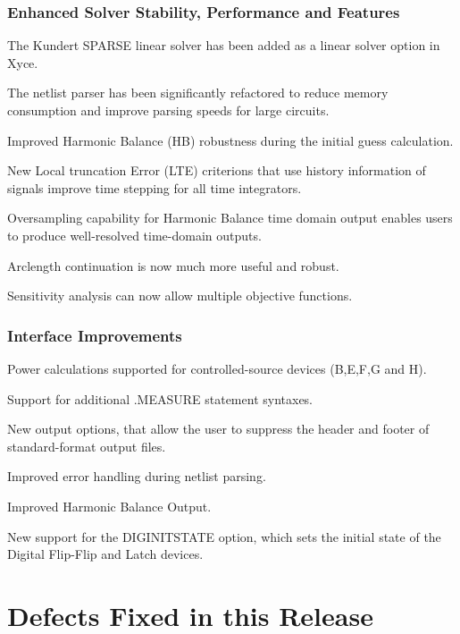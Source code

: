 \documentclass{article}
\begin{document}
\subsubsection*{Enhanced Solver Stability, Performance and Features}
\begin{XyceItemize}
  \item The Kundert SPARSE linear solver has been added as a linear solver option in Xyce.  
  \item The netlist parser has been significantly refactored to reduce memory
        consumption and improve parsing speeds for large circuits.
  \item Improved Harmonic Balance (HB) robustness during the initial guess calculation.
  \item New Local truncation Error (LTE) criterions that use history information of signals improve time stepping for all time integrators.
  \item Oversampling capability for Harmonic Balance time domain output enables users to produce well-resolved time-domain outputs.
  \item Arclength continuation is now much more useful and robust.
  \item Sensitivity analysis can now allow multiple objective functions.
\end{XyceItemize}

\subsubsection*{Interface Improvements}
\begin{XyceItemize}
  \item Power calculations supported for controlled-source devices (B,E,F,G and H).
  \item Support for additional .MEASURE statement syntaxes.
  \item New output options, that allow the user to suppress the header and
        footer of standard-format output files.
  \item Improved error handling during netlist parsing.
  \item Improved Harmonic Balance Output.
  \item New support for the DIGINITSTATE option, which sets the initial state of
        the Digital Flip-Flip and Latch devices.
\end{XyceItemize}


\newpage
\section{Defects Fixed in this Release}

\end{document}
